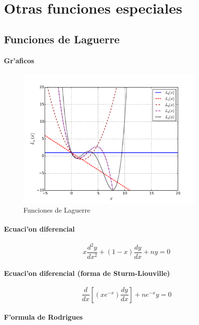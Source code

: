 \chapter{Otras funciones especiales}
\section{Funciones de Laguerre}
\subsubsection{Gr'aficos}
\begin{figure}[!h]
\centerline{\includegraphics[height=7cm,angle=0]{figs/fig-Laguerre.pdf}}
\caption{Funciones de Laguerre}
\end{figure}

\subsubsection{Ecuaci'on diferencial}

\begin{equation}
x\frac{d^{2}y}{dx^{2}}+(1-x)\frac{dy}{dx}+ny=0
\end{equation}

\subsubsection{Ecuaci'on diferencial (forma de Sturm-Liouville)}

\begin{equation}
\frac{d}{dx}\left[\left(xe^{-x} \right)\frac{dy}{dx}\right]+ne^{-x}y=0
\end{equation}

\subsubsection{F'ormula de Rodrigues}

